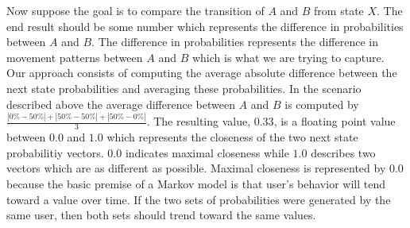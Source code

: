 Now suppose the goal is to compare the 
transition of $A$ and $B$ from state $X$.
The end result should be some number which represents
the difference in probabilities between $A$ and $B$.
The difference in probabilities represents 
the difference in movement patterns between $A$ and $B$
which is what we are trying to capture.
%
Our approach consists of computing
the average absolute difference between the 
next state probabilities
and averaging these probabilities.
%
In the scenario described above
the average difference between $A$ and $B$ 
is computed by
$\frac{|0\%-50\%| + |50\%-50\%| + |50\%-0\%|}{3}$.
The resulting value, $0.33$, is a floating point value
between $0.0$ and $1.0$ which represents
the closeness of the two next state probabilitiy vectors.
$0.0$ indicates maximal closeness while
$1.0$ describes two vectors which are as different as possible.
%
Maximal closeness is represented by $0.0$
because the basic premise of a Markov model
is that user's behavior will tend toward a value
over time.
If the two sets of probabilities were generated by the same user,
then both sets should trend toward the same values.

